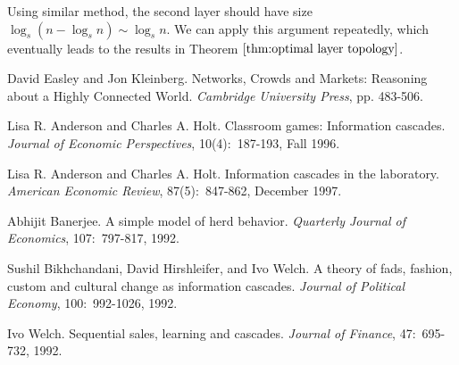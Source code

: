 \documentclass[a4paper,UKenglish]{lipics}
\theoremstyle{definition}
\begin{document}
Using similar method, the second layer should have size $\log_s ( n - \log_s n) \sim \log_s n$.
We can apply this argument repeatedly, which eventually leads to the results in Theorem $\ref{thm:optimal layer topology}$.




%


\nocite{Simpson}

\begin{thebibliography}{99}

David Easley and Jon Kleinberg. Networks, Crowds and Markets: Reasoning about a Highly Connected World. {\em Cambridge University Press}, pp. 483-506.

Lisa R. Anderson and Charles A. Holt. Classroom games: Information cascades. {\em Journal of Economic Perspectives}, 10(4):~187-193, Fall 1996.

Lisa R. Anderson and Charles A. Holt. Information cascades in the laboratory. {\em American Economic Review}, 87(5):~847-862, December 1997.

Abhijit Banerjee. A simple model of herd behavior. {\em Quarterly Journal of Economics}, 107:~797-817, 1992.

Sushil Bikhchandani, David Hirshleifer, and Ivo Welch. A theory of fads, fashion, custom and cultural change as information cascades. {\em Journal of Political Economy}, 100:~992-1026, 1992.

Ivo Welch. Sequential sales, learning and cascades. {\em Journal of Finance}, 47:~695-732, 1992.

\end{thebibliography}
{}

\end{document}
